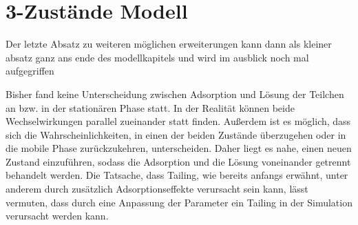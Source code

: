 \section{3-Zustände Modell} 



Der letzte Absatz zu weiteren möglichen erweiterungen kann dann als kleiner absatz ganz ans ende des modellkapitels und wird im ausblick noch mal aufgegriffen


Bisher fand keine Unterscheidung zwischen Adsorption und Lösung der Teilchen an bzw. in der stationären Phase statt. In der Realität können beide Wechselwirkungen parallel zueinander statt finden. Außerdem ist es möglich, dass sich die Wahrscheinlichkeiten, in einen der beiden Zustände überzugehen oder in die mobile Phase zurückzukehren, unterscheiden. Daher liegt es nahe, einen neuen Zustand einzuführen, sodass die Adsorption und die Lösung voneinander getrennt behandelt werden. Die Tatsache, dass Tailing, wie bereits anfangs erwähnt, unter anderem durch zusätzlich Adsorptionseffekte verursacht sein kann, lässt vermuten, dass durch eine Anpassung der Parameter ein Tailing in der Simulation verursacht werden kann. 
 

